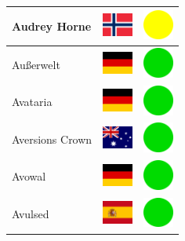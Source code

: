 \documentclass[12pt, a4paper, twoside]{report}
\begin{document}
\begin{center}
\begin{longtable}{|p{5cm}|p{2cm}|p{2cm}|}
 Audrey Horne                                               & \includegraphics[width=1cm]{../4x3/no} &   \includegraphics[width=1cm]{../likes/m} \\ \hline
 Außerwelt                                                  & \includegraphics[width=1cm]{../4x3/de} &   \includegraphics[width=1cm]{../likes/y} \\ \hline
 Avataria                                                   & \includegraphics[width=1cm]{../4x3/de} &   \includegraphics[width=1cm]{../likes/y} \\ \hline
 Aversions Crown                                            & \includegraphics[width=1cm]{../4x3/au} &   \includegraphics[width=1cm]{../likes/y} \\ \hline
 Avowal                                                     & \includegraphics[width=1cm]{../4x3/de} &   \includegraphics[width=1cm]{../likes/y} \\ \hline
 Avulsed                                                    & \includegraphics[width=1cm]{../4x3/es} &   \includegraphics[width=1cm]{../likes/y} \\ \hline

\end{longtable}
\end{center}
\end{document}
